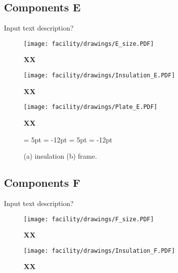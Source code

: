\clearpage
\subsection{Components E}
Input text description?\\

\begin{figure}[h!]
\centering
\texttt{[image: facility/drawings/E\_size.PDF]}
\caption{\footnotesize {\bf XX} } 
\end{figure}

\begin{figure}[h!]
\centering
\texttt{[image: facility/drawings/Insulation\_E.PDF]}
\caption{\footnotesize {\bf XX} } 
\end{figure}

\begin{figure}[h!]
\centering
\texttt{[image: facility/drawings/Plate\_E.PDF]}
\caption{\footnotesize {\bf XX} } 
\end{figure}

\begin{figure}[h!]
  \begin{center}
  {\subfigcapskip = 5pt \subfigcapmargin = -12pt }
   {\subfigcapskip = 5pt \subfigcapmargin = -12pt  }
  \end{center}
\caption{(a) insulation (b) frame. } 
\end{figure}

\clearpage
\subsection{Components F}
Input text description?\\

\begin{figure}[h!]
\centering
\texttt{[image: facility/drawings/F\_size.PDF]}
\caption{\footnotesize {\bf XX} } 
\end{figure}

\begin{figure}[h!]
\centering
\texttt{[image: facility/drawings/Insulation\_F.PDF]}
\caption{\footnotesize {\bf XX} } 
\end{figure}

